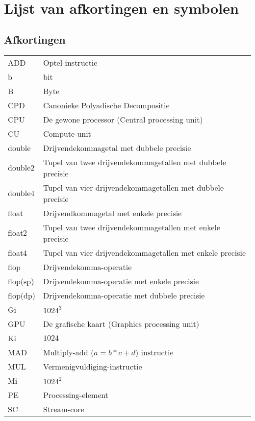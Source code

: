 \documentclass[master=cws ,masteroption=gs]{kulemt}
\begin{document}
\listoffiguresandtables
\chapter{Lijst van afkortingen en symbolen}
\section*{Afkortingen}
\begin{flushleft}
	\renewcommand{\arraystretch}{1.1}
  	\begin{tabularx}{\textwidth}{@{}p{12mm}X@{}}
	ADD			& Optel-instructie\\
	b			& bit\\
	B			& Byte\\
    	CPD			& Canonieke Polyadische Decompositie\\
    	CPU			& De gewone processor (Central processing unit)\\
    	CU			& Compute-unit\\
    	double			& Drijvendekommagetal met dubbele precisie\\
    	double2			& Tupel van twee drijvendekommagetallen met dubbele precisie\\
    	double4			& Tupel van vier drijvendekommagetallen met dubbele precisie\\
    	float			& Drijvendkommagetal met enkele precisie\\
    	float2			& Tupel van twee drijvendekommagetallen met enkele precisie\\
    	float4			& Tupel van vier drijvendekommagetallen met enkele precisie\\
    	flop			& Drijvendekomma-operatie\\
    	flop(sp)		& Drijvendekomma-operatie met enkele precisie\\
    	flop(dp)		& Drijvendekomma-operatie met dubbele precisie\\
    	Gi			& $1024^3$\\
    	GPU			& De grafische kaart (Graphics processing unit)\\
    	Ki			& $1024$\\
    	MAD			& Multiply-add ($a = b * c + d$) instructie\\
	MUL			& Vermenigvuldiging-instructie\\
    	Mi			& $1024^2$\\
    	PE			& Processing-element\\
    	SC			& Stream-core\\
  	\end{tabularx}
\end{flushleft}
\newpage
\end{document}
